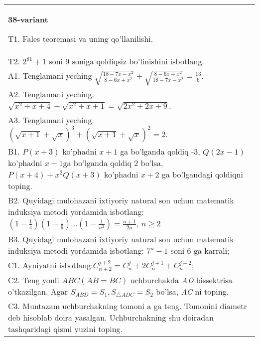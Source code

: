 \documentclass{article}
\begin{document}
\begin{tabular}{m{17cm}}
\textbf{38-variant}
\newline

T1. Fales teoremasi va uning qo'llanilishi. \\
T2. \(2^{81} + 1\) soni 9 soniga qoldiqsiz bo'linishini isbotlang. \\
A1. Tenglamani yeching \(\sqrt{\frac{18 - 7x - x^{2}}{8 - 6x + x^{2}}} + \sqrt{\frac{8 - 6x + x^{2}}{18 - 7x - x^{2}}} = \frac{13}{6}\). \\
A2. Tenglamani yeching. \(\sqrt{x^{2} + x + 4} + \sqrt{x^{2} + x + 1} = \sqrt{2x^{2} + 2x + 9}\). \\
A3. Tenglamani yeching. \((\sqrt{x + 1} + \sqrt{x})^{3} + (\sqrt{x + 1} + \sqrt{x})^{2} = 2\). \\
B1. \(P(x + 3)\) ko'phadni \(x + 1\) ga bo'lganda qoldiq -3, \(Q(2x - 1)\) ko'phadni \(x - 1\)ga bo'lganda qoldiq 2 bo'lsa, \(P(x + 4) + x^{2}Q(x + 3)\) ko'phadni \(x + 2\) ga bo'lgandagi qoldiqni toping. \\
B2. Quyidagi mulohazani ixtiyoriy natural son uchun matematik induksiya metodi yordamida isbotlang: \(\left( 1 - \frac{1}{4} \right)\left( 1 - \frac{1}{9} \right)...\left( 1 - \frac{1}{n^{2}} \right) = \frac{n + 1}{2n}\), \(n \geq 2\) \\
B3. Quyidagi mulohazani ixtiyoriy natural son uchun matematik induksiya metodi yordamida isbotlang: \(7^{n} - 1\) soni 6 ga karrali; \\
C1. Ayniyatni isbotlang:\(C_{n + 2}^{j + 2} = C_{n}^{j} + 2C_{n}^{j + 1} + C_{n}^{j + 2}\); \\
C2. Teng yonli \(ABC(AB = BC)\) uchburchakda \emph{AD} bissektrisa o'tkazilgan. Agar \(S_{ABD} = S_{1},S_{\bigtriangleup ADC} = S_{2}\) bo'lsa, \emph{AC} ni toping. \\
C3. Muntazam uchburchakning tomoni a ga teng. Tomonini diametr deb hisoblab doira yasalgan. Uchburchakning shu doiradan tashqaridagi qismi yuzini toping. \\

\end{tabular}
\vspace{1cm}
\end{document}
